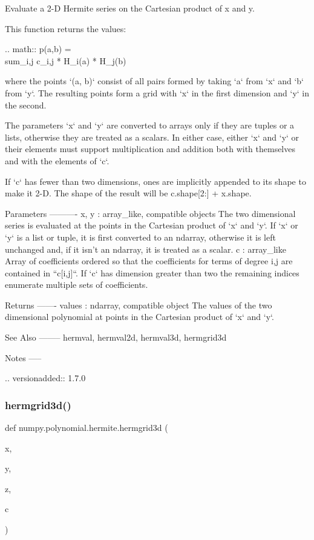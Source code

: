 \begin{DoxyVerb}Evaluate a 2-D Hermite series on the Cartesian product of x and y.

This function returns the values:

.. math:: p(a,b) = \\sum_{i,j} c_{i,j} * H_i(a) * H_j(b)

where the points `(a, b)` consist of all pairs formed by taking
`a` from `x` and `b` from `y`. The resulting points form a grid with
`x` in the first dimension and `y` in the second.

The parameters `x` and `y` are converted to arrays only if they are
tuples or a lists, otherwise they are treated as a scalars. In either
case, either `x` and `y` or their elements must support multiplication
and addition both with themselves and with the elements of `c`.

If `c` has fewer than two dimensions, ones are implicitly appended to
its shape to make it 2-D. The shape of the result will be c.shape[2:] +
x.shape.

Parameters
----------
x, y : array_like, compatible objects
    The two dimensional series is evaluated at the points in the
    Cartesian product of `x` and `y`.  If `x` or `y` is a list or
    tuple, it is first converted to an ndarray, otherwise it is left
    unchanged and, if it isn't an ndarray, it is treated as a scalar.
c : array_like
    Array of coefficients ordered so that the coefficients for terms of
    degree i,j are contained in ``c[i,j]``. If `c` has dimension
    greater than two the remaining indices enumerate multiple sets of
    coefficients.

Returns
-------
values : ndarray, compatible object
    The values of the two dimensional polynomial at points in the Cartesian
    product of `x` and `y`.

See Also
--------
hermval, hermval2d, hermval3d, hermgrid3d

Notes
-----

.. versionadded:: 1.7.0\end{DoxyVerb}
 \mbox{\label{namespacenumpy_1_1polynomial_1_1hermite_abcce001be1631c8db73877468837b937}} 
\subsubsection{\texorpdfstring{hermgrid3d()}{hermgrid3d()}}
{\footnotesize\ttfamily def numpy.\+polynomial.\+hermite.\+hermgrid3d (\begin{DoxyParamCaption}\item[{}]{x,  }\item[{}]{y,  }\item[{}]{z,  }\item[{}]{c }\end{DoxyParamCaption})}


